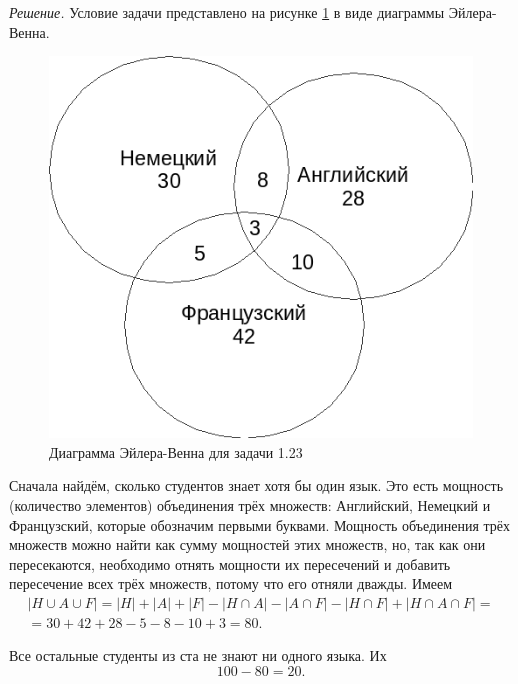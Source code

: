\textit{Решение.} Условие задачи представлено на рисунке \ref{fig:123} в виде диаграммы Эйлера-Венна. 

\begin{figure}[h!]
  \centering
  \includegraphics[width=.4\textwidth]{./pictures/1_23.png}
  \caption{Диаграмма Эйлера-Венна для задачи 1.23}
  \label{fig:123}
\end{figure}

Сначала найдём, сколько студентов знает хотя бы один язык.
Это есть мощность (количество элементов) объединения трёх множеств: Английский, Немецкий и Французский, которые обозначим первыми буквами.
Мощность объединения трёх множеств можно найти как сумму мощностей этих множеств, но, так как они пересекаются,
необходимо отнять мощности их пересечений и добавить пересечение всех трёх множеств, потому что его отняли дважды.
Имеем
\begin{equation*}
\begin{split}
|H \cup A \cup F| =
|H| + |A| + |F| - |H \cap A| - |A \cap F| - |H \cap F| + |H \cap A \cap F| = \\
= 30 + 42 + 28 - 5 - 8 - 10 + 3 = 80.
\end{split}
\end{equation*}

Все остальные студенты из ста не знают ни одного языка.
Их 
$$ 100 - 80 = 20.$$
